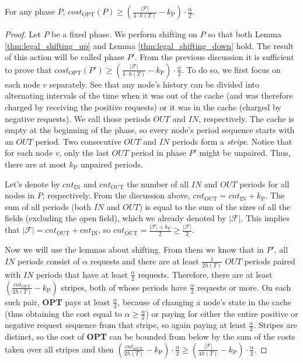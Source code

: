\begin{lemma}
For any phase $P$, $cost_{\mathrm{OPT}}(P) \geq
(\frac{|\mathcal{F}|}{4 \cdot h(T)} -k_{\mathrm{P}}) \cdot \frac{\alpha}{2}$.
\label{thm:opt_bound_with_F} \end{lemma} \begin{proof} Let $P$ be a fixed phase.
We perform shifting on $P$ so that both Lemma \ref{thm:legal_shifting_up} and
Lemma \ref{thm:legal_shifting_down} hold. The result of this action will be
called phase $P'$. From the previous discussion it is sufficient to prove that
$cost_{\mathrm{OPT}}(P') \geq (\frac{|\mathcal{F}|}{4 \cdot h(T)}-k_{\mathrm{P}}) \cdot
\frac{\alpha}{2}$. To do so, we first focus on each node $v$ separately. See
that any node's history can be divided into alternating intervals of the time
when it was out of the cache (and was therefore charged by receiving the
positive requests) or it was in the cache (charged by negative requests). We
call those periods $OUT$ and $IN$, respectively. The cache is empty at the
beginning of the phase, so every node's period sequence starts with an $OUT$
period. Two consecutive $OUT$ and $IN$ periods form a \textit{stripe}. Notice 
that for each node $v$, only the last $OUT$ period in phase $P'$ might be
unpaired. Thus, there are at most $k_{\mathrm{P}}$ unpaired periods.

Let's denote by $cnt_{\mathrm{IN}}$ and $cnt_{\mathrm{OUT}}$ the number of all
$IN$ and $OUT$ periods for all nodes in $P$, respectively. From the 
discussion above, $cnt_{\mathrm{OUT}} = cnt_{\mathrm{IN}} + k_{\mathrm{P}}$. The sum of all
periods (both $IN$ and $OUT$) is equal to the sum of the sizes of all the fields
(excluding the open field), which we already denoted by $|\mathcal{F}|$. This
implies that $|\mathcal{F}| = cnt_{\mathrm{OUT}} + cnt_{\mathrm{IN}}$, so 
$cnt_{\mathrm{OUT}} = \frac{|\mathcal{F}| + k_{\mathrm{P}}}{2} \geq
\frac{|\mathcal{F}|}{2}.$

Now we will use the lemmas about shifting. From them we know that in $P'$, all
$IN$ periods consist of $\alpha$ requests and there are at least
$\frac{1}{2h(T)}$ $OUT$ periods paired with $IN$ periods that have at least
$\frac{\alpha}{2}$ requests. Therefore, there are at least
$(\frac{cnt_{\mathrm{OUT}}}{2h(T)} - k_{\mathrm{P}})$ stripes, both of whose periods have
$\frac{\alpha}{2}$ requests or more. On each such pair, \textbf{OPT} pays at
least $\frac{\alpha}{2}$, because of changing a node's state in the cache (thus
obtaining the cost equal to $\alpha \geq \frac{\alpha}{2}$) or paying for either
the entire positive or negative request sequence from that stripe, 
so again paying at least $\frac{\alpha}{2}$. Stripes are distinct, so the
cost of \textbf{OPT} can be bounded from below by the sum of the costs taken over all stripes and then
$(\frac{cnt_{\mathrm{OUT}}}{2h(T)} - k_{\mathrm{P}}) \cdot \frac{\alpha}{2} \geq
(\frac{|\mathcal{F}|}{4h(T)} - k_{\mathrm{P}}) \cdot  \frac{\alpha}{2}$.  \end{proof}

